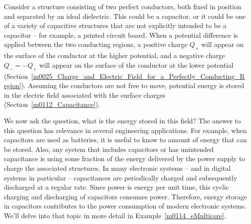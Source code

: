 

\label{m0114_Electric_Energy} %

Consider a structure consisting of two perfect conductors, both fixed in position and separated by an ideal dielectric.
This could be a capacitor, 
or it could be one of a variety of capacitive structures that are not explicitly intended to be a capacitor -- for example, a printed circuit board.
When a potential difference is applied between the two conducting regions, a positive charge $Q_+$ will appear on the surface of the conductor at the higher potential, and a negative charge $Q_-=-Q_+$ will appear on the surface of the conductor at the lower potential (Section~\ref{m0025_Charge_and_Electric_Field_for_a_Perfectly_Conducting_Region}).
Assuming the conductors are not free to move, potential energy 
is stored in the electric field associated with the surface charges (Section~\ref{m0112_Capacitance}).

We now ask the question, what is the energy stored in this field? 
The answer to this question has relevance in several engineering applications.
For example, when capacitors are used as batteries, it is useful to know to amount of energy that can be stored.
Also, any system that includes capacitors or has unintended capacitance is using some fraction of the energy delivered by the power supply to charge the associated structures. In many electronic systems -- and in digital systems in particular -- capacitances are periodically charged and subsequently discharged at a regular rate.  Since power is energy per unit time, this cyclic charging and discharging of capacitors consumes power.  Therefore, energy storage in capacitors contributes to the power consumption of modern electronic systems. We'll delve into that topic in more detail in Example~\ref{m0114_eMulticore}.

